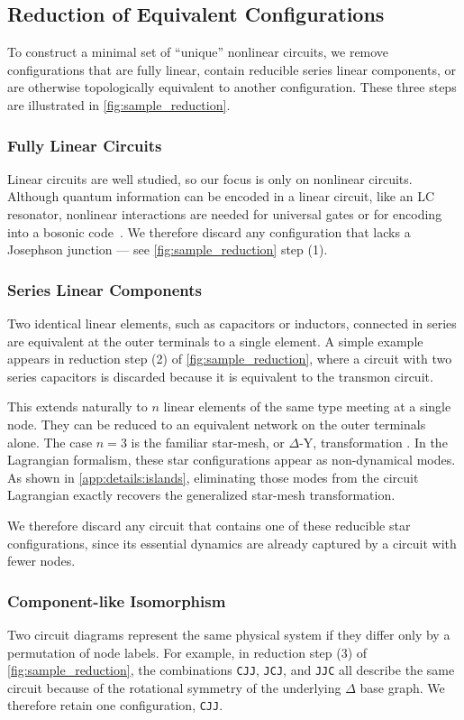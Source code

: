 \subsection{Reduction of Equivalent Configurations}
\label{sec:equiv_reduction}
To construct a minimal set of ``unique'' nonlinear circuits, we remove configurations that are fully linear, contain reducible series linear components, or are otherwise topologically equivalent to another configuration. These three steps are illustrated in \cref{fig:sample_reduction}.

\subsubsection{Fully Linear Circuits}
Linear circuits are well studied, so our focus is only on nonlinear circuits. Although quantum information can be encoded in a linear circuit, like an LC resonator, nonlinear interactions are needed for universal gates or for encoding into a bosonic code~\cite{ofek2016,ni2023,sivak2023}. We therefore discard any configuration that lacks a Josephson junction --- see \cref{fig:sample_reduction} step (1).

\subsubsection{Series Linear Components}
Two identical linear elements, such as capacitors or inductors, connected in series are equivalent at the outer terminals to a single element. A simple example appears in reduction step (2) of \cref{fig:sample_reduction}, where a circuit with two series capacitors is discarded because it is equivalent to the transmon circuit.

This extends naturally to $n$ linear elements of the same type meeting at a single node. They can be reduced to an equivalent network on the outer terminals alone. The case $n=3$ is the familiar star-mesh, or $\Delta$-Y, transformation \cite{kennelly_delta_wye_1899, rosen_new_1924}. In the Lagrangian formalism, these star configurations appear as non-dynamical modes. As shown in \cref{app:details:islands}, eliminating those modes from the circuit Lagrangian exactly recovers the generalized star-mesh transformation.


We therefore discard any circuit that contains one of these reducible star configurations, since its essential dynamics are already captured by a circuit with fewer nodes. 


\subsubsection{Component-like Isomorphism}
Two circuit diagrams represent the same physical system if they differ only by a permutation of node labels. For example, in reduction step (3) of \cref{fig:sample_reduction}, the combinations \texttt{CJJ}, \texttt{JCJ}, and \texttt{JJC} all describe the same circuit because of the rotational symmetry of the underlying $\Delta$ base graph. We therefore retain one configuration, \texttt{CJJ}.

